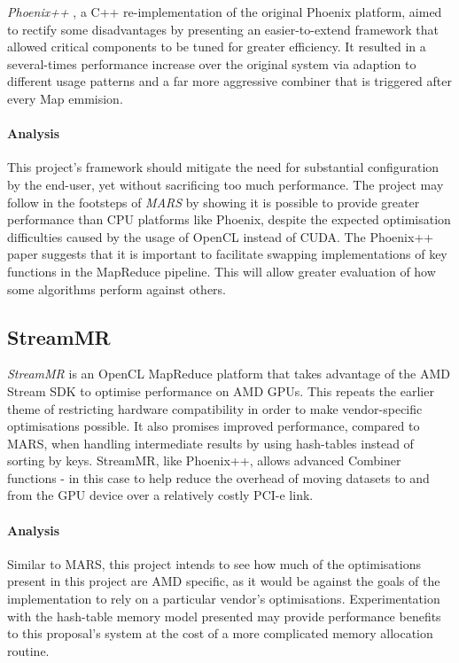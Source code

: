 \emph{Phoenix++} \cite{phoenix++}, a C++ re-implementation of the original Phoenix platform, aimed to rectify some disadvantages by presenting an easier-to-extend framework that allowed critical components to be tuned for greater efficiency. It resulted in a several-times performance increase over the original system via adaption to different usage patterns and a far more aggressive combiner that is triggered after every Map emmision.

\paragraph{Analysis}
This project's framework should mitigate the need for substantial configuration by the end-user, yet without sacrificing too much performance. The project may follow in the footsteps of \emph{MARS} by showing it is possible to provide greater performance than CPU platforms like Phoenix, despite the expected optimisation difficulties caused by the usage of OpenCL instead of CUDA.
The Phoenix++ paper suggests that it is important to facilitate swapping implementations of key functions in the MapReduce pipeline. This will allow greater evaluation of how some algorithms perform against others.

\subsection{StreamMR}
\emph{StreamMR} \cite{streammr} is an OpenCL MapReduce platform that takes advantage of the AMD Stream SDK to optimise performance on AMD \ac{GPUs}. This repeats the earlier theme of restricting hardware compatibility in order to make vendor-specific optimisations possible. It also promises improved performance, compared to MARS, when handling intermediate results by using hash-tables instead of sorting by keys. StreamMR, like Phoenix++, allows advanced Combiner functions - in this case to help reduce the overhead of moving datasets to and from the GPU device over a relatively costly PCI-e link.

\paragraph{Analysis}
Similar to MARS, this project intends to see how much of the optimisations present in this project are AMD specific, as it would be against the goals of the implementation to rely on a particular vendor's optimisations. Experimentation with the hash-table memory model presented may provide performance benefits to this proposal's system at the cost of a more complicated memory allocation routine.
